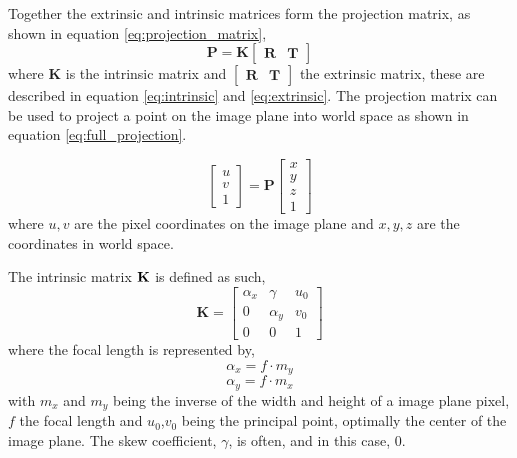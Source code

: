         \noindent
        Together the extrinsic and intrinsic matrices form the projection matrix,
        as shown in equation \ref{eq:projection_matrix},
        \begin{equation} \label{eq:projection_matrix}
            \bm{P} = \bm{K}
            \begin{bmatrix}
                \bm{R} & \bm{T}
            \end{bmatrix}
        \end{equation}
        where \(\bm{K}\) is the intrinsic matrix and \(\begin{bmatrix} \bm{R} & \bm{T} \end{bmatrix}\) the extrinsic matrix, these are described
        in equation \ref{eq:intrinsic} and \ref{eq:extrinsic}.
        The projection matrix can be used to project a point on the image plane into world space as shown in equation \ref{eq:full_projection}.

        \begin{equation} \label{eq:full_projection}
            \begin{bmatrix}
                u \\
                v \\
                1
            \end{bmatrix}
            = \bm{P}
            \begin{bmatrix}
                x \\
                y \\
                z \\
                1
            \end{bmatrix}
        \end{equation}
        where \(u,v\) are the pixel coordinates on the image plane and \(x,y,z\) are the coordinates in world space.

        The intrinsic matrix \(\bf{K}\) is defined as such,
        \begin{equation} \label{eq:intrinsic}
            \bm{K} =
            \begin{bmatrix}
                \alpha_x & \gamma   & u_0 \\
                0        & \alpha_y & v_0 \\
                0        & 0        & 1
            \end{bmatrix}
        \end{equation}
        where the focal length is represented by,
        \[\alpha_x = f \cdot m_y\]
        \[\alpha_y = f \cdot m_x\]
        with \(m_x\) and \(m_y\) being the inverse of the width and height of a image plane pixel, \(f\) the focal length and \(u_0\),\(v_0\) being the principal point, optimally the center of the image plane.
        The skew coefficient, \(\gamma\), is often, and in this case, 0.

